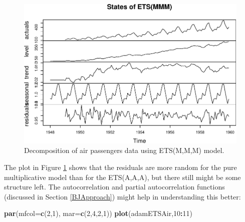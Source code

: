 \documentclass[]{book}
\newenvironment{Shaded}{\begin{snugshade}}{\end{snugshade}}
\newcommand{\DataTypeTok}[1]{\textcolor[rgb]{0.13,0.29,0.53}{#1}}
\newcommand{\DecValTok}[1]{\textcolor[rgb]{0.00,0.00,0.81}{#1}}
\newcommand{\KeywordTok}[1]{\textcolor[rgb]{0.13,0.29,0.53}{\textbf{#1}}}
\newcommand{\NormalTok}[1]{#1}
\newcommand{\OperatorTok}[1]{\textcolor[rgb]{0.81,0.36,0.00}{\textbf{#1}}}
\theoremstyle{definition}
\theoremstyle{definition}
\theoremstyle{definition}
\theoremstyle{definition}
\theoremstyle{remark}
\begin{document}
\begin{figure}
\centering
\includegraphics{Svetunkov--2022----ADAM_files/figure-latex/AirPassengersMMMDecomposition-1.pdf}
\caption{\label{fig:AirPassengersMMMDecomposition}Decomposition of air passengers data using ETS(M,M,M) model.}
\end{figure}

The plot in Figure \ref{fig:AirPassengersMMMDecomposition} shows that the residuals are more random for the pure multiplicative model than for the ETS(A,A,A), but there still might be some structure left. The autocorrelation and partial autocorrelation functions (discussed in Section \ref{BJApproach}) might help in understanding this better:

\begin{Shaded}
\begin{Highlighting}[]
\KeywordTok{par}\NormalTok{(}\DataTypeTok{mfcol=}\KeywordTok{c}\NormalTok{(}\DecValTok{2}\NormalTok{,}\DecValTok{1}\NormalTok{), }\DataTypeTok{mar=}\KeywordTok{c}\NormalTok{(}\DecValTok{2}\NormalTok{,}\DecValTok{4}\NormalTok{,}\DecValTok{2}\NormalTok{,}\DecValTok{1}\NormalTok{))}
\KeywordTok{plot}\NormalTok{(adamETSAir,}\DecValTok{10}\OperatorTok{:}\DecValTok{11}\NormalTok{)}
\end{Highlighting}
\end{Shaded}
\end{document}
